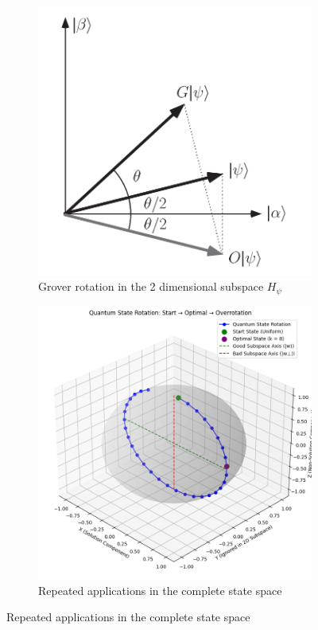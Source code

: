 \documentclass[encoding=utf8,british]{tumphthesis}
\begin{document}
        \begin{figure}
        \centering
        \begin{subfigure}{.5\textwidth}
        \centering
        \includegraphics[width=\linewidth]{pics/grover_rot.png}
        \caption{Grover rotation in the 2 dimensional subspace $H_{\psi}$}
        \label{fig:Grover_rot_diag}
        \end{subfigure}%
        \begin{subfigure}{.5\textwidth}
        \centering
        \includegraphics[width=\linewidth]{pics/Quantum State Rotation 3D.png}
        \caption{ Repeated applications in the complete state space}
        \label{fig:Grover_rot_mine}
        \end{subfigure}
        \label{fig:Grover_rot}
        \end{figure}
\end{document}
